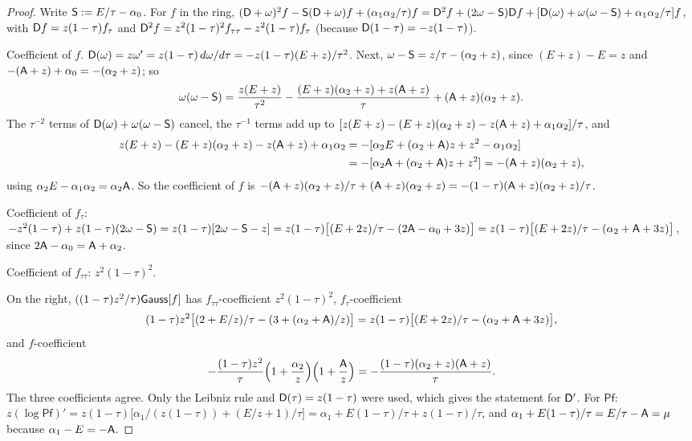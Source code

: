 \begin{proof}
Write $\mathsf{S} := E/\tau - \alpha_0$. For $f$ in the ring, $(\mathsf{D}+\omega)^2f - \mathsf{S}(\mathsf{D}+\omega)f + (\alpha_1\alpha_2/\tau)f = \mathsf{D}^2f + (2\omega - \mathsf{S})\mathsf{D} f + [\mathsf{D}(\omega) + \omega(\omega-\mathsf{S}) + \alpha_1\alpha_2/\tau]f$, with $\mathsf{D} f = z(1-\tau)f_\tau$ and $\mathsf{D}^2f = z^2(1-\tau)^2f_{\tau\tau} - z^2(1-\tau)f_\tau$ (because $\mathsf{D}(1-\tau) = -z(1-\tau)$).

Coefficient of $f$. $\mathsf{D}(\omega) = z\omega' = z(1-\tau)\,d\omega/d\tau = -z(1-\tau)(E+z)/\tau^2$. Next, $\omega - \mathsf{S} = z/\tau - (\alpha_2+z)$, since $(E+z)-E = z$ and $-(\mathsf{A}+z)+\alpha_0 = -(\alpha_2+z)$; so
\[
\omega(\omega-\mathsf{S}) = \frac{z(E+z)}{\tau^2} - \frac{(E+z)(\alpha_2+z) + z(\mathsf{A}+z)}{\tau} + (\mathsf{A}+z)(\alpha_2+z).
\]
The $\tau^{-2}$ terms of $\mathsf{D}(\omega) + \omega(\omega-\mathsf{S})$ cancel, the $\tau^{-1}$ terms add up to $[z(E+z) - (E+z)(\alpha_2+z) - z(\mathsf{A}+z) + \alpha_1\alpha_2]/\tau$, and
\begin{align*}
z(E+z) - (E+z)(\alpha_2+z) - z(\mathsf{A}+z) + \alpha_1\alpha_2 &= -[\alpha_2E + (\alpha_2+\mathsf{A})z + z^2 - \alpha_1\alpha_2]\\
&= -[\alpha_2\mathsf{A} + (\alpha_2+\mathsf{A})z + z^2] = -(\mathsf{A}+z)(\alpha_2+z),
\end{align*}
using $\alpha_2E - \alpha_1\alpha_2 = \alpha_2\mathsf{A}$. So the coefficient of $f$ is $-(\mathsf{A}+z)(\alpha_2+z)/\tau + (\mathsf{A}+z)(\alpha_2+z) = -(1-\tau)(\mathsf{A}+z)(\alpha_2+z)/\tau$.

Coefficient of $f_\tau$: $-z^2(1-\tau) + z(1-\tau)(2\omega-\mathsf{S}) = z(1-\tau)[2\omega - \mathsf{S} - z] = z(1-\tau)\bigl[(E+2z)/\tau - (2\mathsf{A} - \alpha_0 + 3z)\bigr] = z(1-\tau)\bigl[(E+2z)/\tau - (\alpha_2+\mathsf{A}+3z)\bigr]$, since $2\mathsf{A}-\alpha_0 = \mathsf{A} + \alpha_2$.

Coefficient of $f_{\tau\tau}$: $z^2(1-\tau)^2$.

On the right, $((1-\tau)z^2/\tau)\mathsf{Gauss}[f]$ has $f_{\tau\tau}$-coefficient $z^2(1-\tau)^2$, $f_\tau$-coefficient
\[
(1-\tau)z^2\bigl[(2+E/z)/\tau - (3+(\alpha_2+\mathsf{A})/z)\bigr] = z(1-\tau)\bigl[(E+2z)/\tau - (\alpha_2+\mathsf{A}+3z)\bigr],
\]
and $f$-coefficient
\[
-\frac{(1-\tau)z^2}{\tau}\Bigl(1+\frac{\alpha_2}{z}\Bigr)\Bigl(1+\frac{\mathsf{A}}{z}\Bigr) = -\frac{(1-\tau)(\alpha_2+z)(\mathsf{A}+z)}{\tau}.
\]
The three coefficients agree. Only the Leibniz rule and $\mathsf{D}(\tau) = z(1-\tau)$ were used, which gives the statement for $\mathsf{D}'$. For $\mathsf{Pf}$: $z(\log\mathsf{Pf})' = z(1-\tau)\bigl[\alpha_1/(z(1-\tau)) + (E/z+1)/\tau\bigr] = \alpha_1 + E(1-\tau)/\tau + z(1-\tau)/\tau$, and $\alpha_1 + E(1-\tau)/\tau = E/\tau - \mathsf{A} = \mu$ because $\alpha_1 - E = -\mathsf{A}$.
\end{proof}

